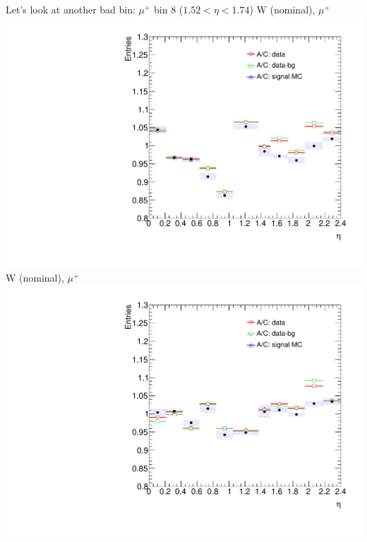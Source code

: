  {
Let's look at another bad bin: $\mu^{+}$ bin 8 ($1.52<\eta<1.74$)
}
 {
\colb[T]
\centering
\small{ W (nominal), $\mu^{+}$}
\includegraphics[width=1.0\textwidth]{dates/20130306/figures/wz/W_NOM_Q0_stack_d3_eta_lpt_met_y_2__1_z_0__1_POS}
\centering
\small{ W (nominal), $\mu^{+}$}
\includegraphics[width=1.0\textwidth]{dates/20130306/figures/wz/W_NOM_Q0_stack_d3_eta_lpt_met_y_2__1_z_0__1_NEG}
\cole
}
